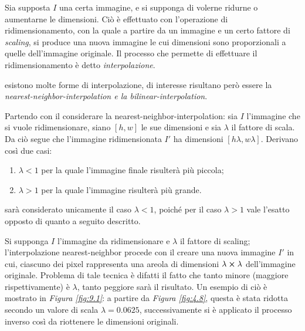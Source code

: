 \documentclass{subfiles}
\begin{document}
Sia supposta \(I\) una certa immagine, e si supponga di volerne ridurne o aumentarne le dimensioni.
Ciò è effettuato con l'operazione di ridimensionamento, con la quale a partire da un immagine e un certo fattore di \emph{scaling},
si produce una nuova immagine le cui dimensioni sono proporzionali a quelle dell'immagine originale.
Il processo che permette di effettuare il ridimensionamento è detto \emph{interpolazione}.

\begin{Note*}
    esistono molte forme di interpolazione, di interesse risultano però essere la \emph{nearest-neighbor-interpolation \emph{e la} bilinear-interpolation}.
\end{Note*}

Partendo con il considerare la nearest-neighbor-interpolation: sia \(I\) l'immagine che si vuole ridimensionare,
siano \([h, w]\) le sue dimensioni e sia \(\lambda\) il fattore di scala. Da ciò segue che l'immagine ridimensionata \(I'\) ha dimensioni \([h\lambda, w\lambda]\).
Derivano così due casi:
\begin{enumerate}
    \item \(\lambda < 1\) per la quale l'immagine finale risulterà più piccola;
    \item \(\lambda > 1\) per la quale l'immagine risulterà più grande.
\end{enumerate}

\begin{Note*}
    sarà considerato unicamente il caso \(\lambda < 1\), poiché per il caso \(\lambda > 1\) vale l'esatto opposto di quanto a seguito descritto.
\end{Note*}

Si supponga \(I\) l'immagine da ridimensionare e \(\lambda\) il fattore di scaling; l'interpolazione nearest-neighbor procede con il creare una nuova immagine \(I'\) in cui,
ciascuno dei pixel rappresenta una areola di dimensioni \(\lambda \cp \lambda\) dell'immagine originale.
Problema di tale tecnica è difatti il fatto che tanto minore (maggiore rispettivamente) è \(\lambda\), tanto peggiore sarà il risultato.
Un esempio di ciò è mostrato in \emph{Figura \ref{fig:9.1}}: a partire da \emph{Figura \ref{fig:4.8}}, questa è stata ridotta secondo un valore di scala \(\lambda = 0.0625\),
successivamente si è applicato il processo inverso così da riottenere le dimensioni originali.


\end{document}
